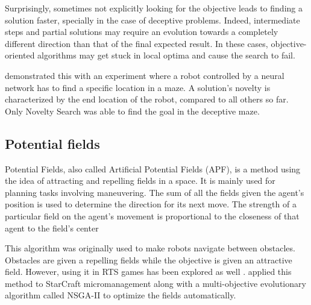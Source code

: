 Surprisingly, sometimes not explicitly looking for the objective leads
to finding a solution faster, specially in the case of deceptive
problems.  Indeed, intermediate steps and partial solutions may
require an evolution towards a completely different direction than
that of the final expected result. In these cases, objective-oriented
algorithms may get stuck in local optima and cause the search to
fail.

\citet{Lehman11Novelty} demonstrated this with an experiment where a robot
controlled by a neural network has to find a specific location in a
maze. A solution's novelty is characterized by the end location of the
robot, compared to all others so far. Only Novelty Search was able to
find the goal in the deceptive maze.

\subsection{Potential fields}\label{subsec:potential-fields}

Potential Fields, also called Artificial Potential Fields (APF), is a
method using the idea of attracting and repelling fields in a
space. It is mainly used for planning tasks involving maneuvering.
The sum of all the fields given the agent's position is used to
determine the direction for its next move. The strength of a
particular field on the agent's movement is proportional to the
closeness of that agent to the field's center

This algorithm was originally used to make robots navigate between
obstacles. Obstacles are given a repelling fields while the objective
is given an attractive field. However, using it in RTS games has been
explored as well \cite{Hagelback08RTSPotentialFields}.
\citet{Svendsen12SCPotentialFieldsGP} applied this method to
StarCraft micromanagement along with a multi-objective evolutionary
algorithm called NSGA-II to optimize the fields automatically.
